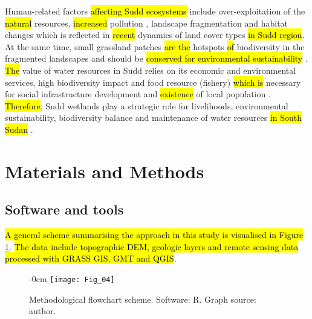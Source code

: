 \documentclass[sustainability,article,submit,pdftex,moreauthors]{Definitions/mdpi}
\begin{document}
Human-related factors \hl{affecting Sudd ecosystems }include over-exploitation of the \hl{natural }resources, \hl{increased }pollution \cite{LOW2021113424}, landscape fragmentation \cite{Collins} and habitat changes \cite{NAGENDRA201345} which is reflected in \hl{recent }dynamics of land cover types \hl{in Sudd region}. At the same time, small grassland patches \hl{are the} hotspots \hl{of} biodiversity in the fragmented landscapes and should be \hl{conserved for environmental sustainability }\cite{YAN2021108086}. \hl{The} value of water resources in Sudd relies on its economic and environmental services, high biodiversity impact and food resource (fishery) \cite{Bailey} \hl{which is }necessary for social infrastructure development and \hl{existence} of local population \cite{assessment2005ecosystems}. \hl{Therefore}, Sudd wetlands play a strategic role for livelihoods, environmental sustainability, biodiversity balance and maintenance of water resources \hl{in South Sudan }\cite{Benansio}. 

\section{Materials and Methods}

\subsection{Software and tools}
\hl{A general scheme summarising the approach in this study is visualised in Figure} \ref{fig04}. \hl{The data include topographic DEM, geologic layers and remote sensing data processed with GRASS GIS, GMT and QGIS}.

\begin{figure}[H]
\begin{adjustwidth}{-\extralength}{0cm}
\centering
	\hspace{130pt}\texttt{[image: Fig\_04]}
\end{adjustwidth}
\caption{Methodological flowchart scheme. Software: R. Graph source: author.
\label{fig04}}
\end{figure}
\end{document}
